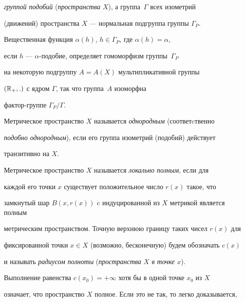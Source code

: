 {\it группой подобий} ({\it пространства} $X$), а группа~$\Gamma$ всех изометрий


(движений) пространства $X$ --- нормальная подгруппа группы $\Gamma_{P}$.


Вещественная функция $\alpha(h)$, $h \in \Gamma_{P}$, где $\alpha(h)=\alpha$,


если $h$ --- $\alpha$-подобие, определяет гомоморфизм группы~$\Gamma_{P}$


на некоторую подгруппу $A = A(X)$ мультипликативной группы


$(\Bbb{R}_{+},.)$ с ядром $\Gamma$, так что группа~$A$ изоморфна


фактор-группе $\Gamma_{P}/\Gamma$.





\begin{defns}


Метрическое пространство $X$ называется {\it однородным} (соответcтвенно


{\it подобно однородным}), если его группа изометрий (подобий) действует


транзитивно на $X$.


\end{defns}





\begin{defns}


\label{rad}


Метрическое пространство $X$ называется {\it локально полным}, если для


каждой его точки $x$ существует положительное число $r(x)$ такое, что


замкнутый шар $B(x,r(x))$ c индуцированной из $X$ метрикой является полным


метрическим пространством. Точную верхнюю границу таких чисел $r(x)$ для


фиксированной точки $x \in X$ (возможно, бесконечную) будем обозначать $c(x)$


и называть {\it радиусом полноты} ({\it пространства $X$ в точке $x$}).


\end{defns}





Выполнение равенства $c(x_{0}) =+\infty$ хотя бы в одной точке $x_{0}$ из $X$


означает, что пространство $X$ полное. Если это не так, то легко доказывается,


